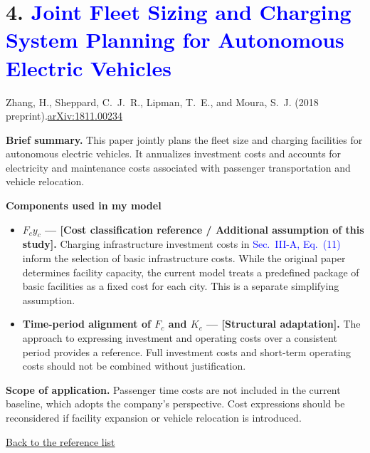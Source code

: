 \documentclass[10pt,a4paper]{article}
\newcommand{\zhangtitle}{Joint Fleet Sizing and Charging System Planning for Autonomous Electric Vehicles}
\newcommand{\backtolist}{\par\smallskip\hyperlink{paper:list}{Back to the reference list}\par}
\begin{document}
\hypertarget{paper:zhang}{}
\section*{4. \textcolor{blue}{\zhangtitle}}
{\color{blue}Zhang, H., Sheppard, C.~J.~R., Lipman, T.~E., and Moura, S.~J. (2018 preprint).}\quad \href{https://arxiv.org/abs/1811.00234}{arXiv:1811.00234}

\textbf{Brief summary.} This paper jointly plans the fleet size and charging facilities for autonomous electric vehicles. It annualizes investment costs and accounts for electricity and maintenance costs associated with passenger transportation and vehicle relocation.

\textbf{Components used in my model}
\begin{itemize}
\item \textbf{$F_cy_c$ --- [Cost classification reference / Additional assumption of this study].} Charging infrastructure investment costs in \textcolor{blue}{Sec.~III-A, Eq.~(11)} inform the selection of basic infrastructure costs. While the original paper determines facility capacity, the current model treats a predefined package of basic facilities as a fixed cost for each city. This is a separate simplifying assumption.
\item \textbf{Time-period alignment of $F_c$ and $K_c$ --- [Structural adaptation].} The approach to expressing investment and operating costs over a consistent period provides a reference. Full investment costs and short-term operating costs should not be combined without justification.
\end{itemize}
\textbf{Scope of application.} Passenger time costs are not included in the current baseline, which adopts the company's perspective. Cost expressions should be reconsidered if facility expansion or vehicle relocation is introduced.
\backtolist

\newpage
\hypertarget{assumption:idle}{}
\end{document}
